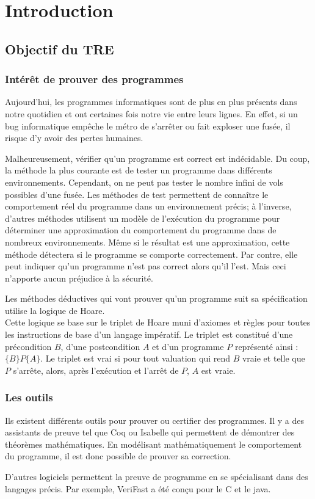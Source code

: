 \documentclass[9pt]{book}
\newcommand{\verifast}{VeriFast}
\begin{document}
\chapter*{Introduction}
	\section*{Objectif du TRE}
		\subsection*{Int\'er\^et de prouver des programmes}
		Aujourd'hui, les programmes informatiques sont de plus en plus pr\'esents dans notre quotidien et ont certaines fois notre vie entre leurs lignes. En effet, si un bug informatique emp\^eche le m\'etro de s'arr\^eter ou fait exploser une fus\'ee, il risque d'y avoir des pertes humaines. \par
		Malheureusement, v\'erifier qu'un programme est correct est ind\'ecidable. Du coup, la m\'ethode la plus courante est de tester un programme dans diff\'erents environnements. Cependant, on ne peut pas tester le nombre infini de vols possibles d'une fus\'ee. Les m\'ethodes de test permettent de conna\^itre le comportement r\'eel du programme dans un environnement pr\'ecis; \`a l'inverse, d'autres m\'ethodes utilisent un mod\`ele de l'ex\'ecution du programme pour d\'eterminer une approximation du comportement du programme dans de nombreux environnements. M\^eme si le r\'esultat est une approximation, cette m\'ethode d\'etectera si le programme se comporte correctement. Par contre, elle peut indiquer qu'un programme n'est pas correct alors qu'il l'est. Mais ceci n'apporte aucun pr\'ejudice \`a la s\'ecurit\'e.
\par Les m\'ethodes d\'eductives qui vont prouver qu'un programme suit sa sp\'ecification utilise la logique de Hoare.\\
		Cette logique se base sur le triplet de Hoare muni d'axiomes et r\`egles pour toutes les instructions de base d'un langage imp\'eratif. Le triplet est constitu\'e d'une pr\'econdition $B$, d'une postcondition $A$ et d'un programme $P$ repr\'esent\'e ainsi : $\{B\}P\{A\}$. Le triplet est vrai si pour tout valuation qui rend $B$ vraie et telle que $P$ s'arr\^ete, alors, apr\`es l'ex\'ecution et l'arr\^et de $P$, $A$ est vraie.
		
		

		\subsection*{Les outils}
		Ils existent diff\'erents outils pour prouver ou certifier des programmes. Il y a des assistants de preuve tel que Coq ou Isabelle qui permettent de d\'emontrer des th\'eor\`emes math\'ematiques. En mod\'elisant math\'ematiquement le comportement du programme, il est donc possible de prouver sa correction. \par
	D'autres logiciels permettent la preuve de programme en se sp\'ecialisant dans des langages pr\'ecis. Par exemple, \verifast{} a \'et\'e con\c{c}u pour le C et le java.
\end{document}
